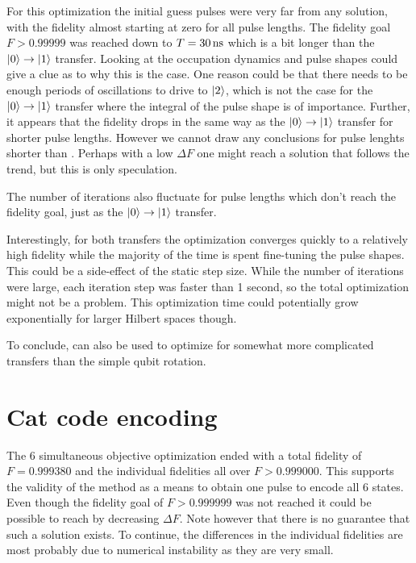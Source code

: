 \documentclass[main.tex]{subfiles}
\begin{document}
For this optimization the initial guess pulses were very far from any solution, with the fidelity almost starting at zero for all pulse lengths.
The fidelity goal \(F > 0.99999\) was reached down to \(T = \SI{30}{\nano\second}\) which is a bit longer than the \(\ket{0}\rightarrow\ket{1}\) transfer.
Looking at the occupation dynamics and pulse shapes could give a clue as to why this is the case.
One reason could be that there needs to be enough periods of oscillations to drive to \(\ket{2}\), which is not the case for the \(\ket{0}\rightarrow\ket{1}\) transfer where the integral of the pulse shape is of importance.
Further, it appears that the fidelity drops in the same way as the \(\ket{0}\rightarrow\ket{1}\) transfer for shorter pulse lengths.
However we cannot draw any conclusions for pulse lenghts shorter than .
Perhaps with a low \(\Delta F\) one might reach a solution that follows the trend, but this is only speculation.

The number of iterations also fluctuate for pulse lengths which don't reach the fidelity goal, just as the \(\ket{0}\rightarrow\ket{1}\) transfer.

Interestingly, for both transfers the optimization converges quickly to a relatively high fidelity while the majority of the time is spent fine-tuning the pulse shapes.
This could be a side-effect of the static step size.
While the number of iterations were large, each iteration step was faster than 1 second, so the total optimization might not be a problem.
This optimization time could potentially grow exponentially for larger Hilbert spaces though.

To conclude, \krotov{} can also be used to optimize for somewhat more complicated transfers than the simple qubit rotation.

\section{Cat code encoding}
The 6 simultaneous objective optimization ended with a total fidelity of \(F = 0.999380\) and the individual fidelities all over \(F > 0.999000\).
This supports the validity of the method as a means to obtain one pulse to encode all 6 states.
Even though the fidelity goal of \(F > 0.999999\) was not reached it could be possible to reach by decreasing \(\Delta F\).
Note however that there is no guarantee that such a solution exists.
To continue, the differences in the individual fidelities are most probably due to numerical instability as they are very small.
\end{document}
